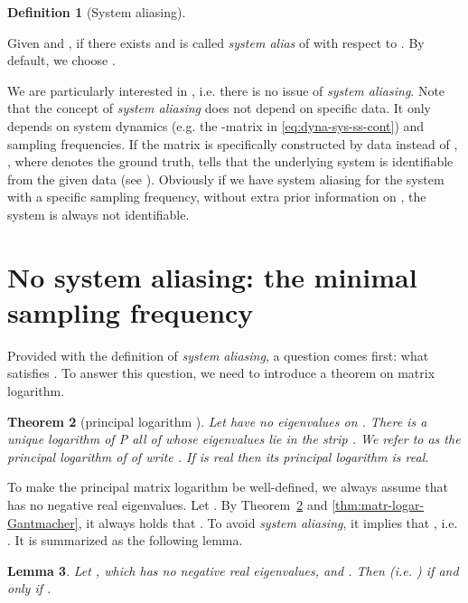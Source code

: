 \documentclass[letterpaper,10pt,journal,final]{IEEEtran}
\newtheorem{theorem}{Theorem}
\newtheorem{lemma}[theorem]{Lemma}
\theoremstyle{definition}
\newtheorem{definition}[theorem]{Definition}
\theoremstyle{remark}
\begin{document}
\begin{definition}[System aliasing]
  \label{def:system-aliasing}

  Given  and , if there exists
   and  is called
  \emph{system alias} of  with respect to .  By default, we
  choose
  .
\end{definition}

We are particularly interested in ,
i.e. there is no issue of \emph{system aliasing}.  Note that the concept of
\emph{system aliasing} does not depend on specific data. It only depends on
system dynamics (e.g. the -matrix in \eqref{eq:dyna-sys-ss-cont}) and
sampling frequencies.  If the  matrix is specifically constructed by data
instead of , , where  denotes
the ground truth, tells that the underlying system is identifiable from the
given data (see \cite[Sec.~III-B]{Yue2016b}).  Obviously if we have {system
  aliasing} for the system with a specific sampling frequency, without extra
prior information on , the system is always not identifiable.





\section{No system aliasing: the minimal sampling frequency}
\label{sec:no-system-aliasing}



Provided with the definition of \emph{system aliasing}, a question comes first: what  satisfies . To answer this question, we need to introduce a theorem on matrix logarithm.
\begin{theorem}[principal logarithm {\protect \cite[Thm.~1.31]{Higham2008}}]
  \label{thm:log-uniq-matrix}
  Let  have no eigenvalues on . There is a unique logarithm  of P all of whose eigenvalues lie in the strip . We refer to  as the principal logarithm of  of write . If  is real then its principal logarithm is real.
\end{theorem}

To make the principal matrix logarithm  be well-defined, we always assume
that  has no negative real eigenvalues.  Let
.
By Theorem~\ref{thm:log-uniq-matrix} and \ref{thm:matr-logar-Gantmacher}, it always
holds that . To avoid
\emph{system aliasing}, it implies that  , i.e.
. It is summarized as the following lemma.

\begin{lemma}
  \label{lemma:A=Ahat}
  Let , which has no negative real eigenvalues,
  and . Then 
  (i.e. ) if and only if
  .
\end{lemma}
\end{document}
